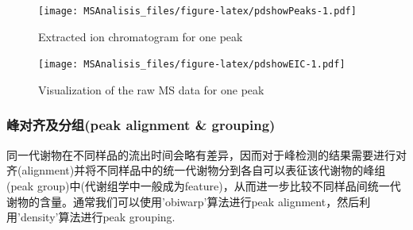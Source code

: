 \documentclass[]{ctexbook}
\newenvironment{Shaded}{\begin{snugshade}}{\end{snugshade}}
\newcommand{\CommentTok}[1]{\textcolor[rgb]{0.56,0.35,0.01}{\textit{#1}}}
\newcommand{\DataTypeTok}[1]{\textcolor[rgb]{0.13,0.29,0.53}{#1}}
\newcommand{\KeywordTok}[1]{\textcolor[rgb]{0.13,0.29,0.53}{\textbf{#1}}}
\newcommand{\NormalTok}[1]{#1}
\newcommand{\OperatorTok}[1]{\textcolor[rgb]{0.81,0.36,0.00}{\textbf{#1}}}
\newcommand{\StringTok}[1]{\textcolor[rgb]{0.31,0.60,0.02}{#1}}
\begin{document}
\begin{figure}
\centering
\texttt{[image: MSAnalisis\_files/figure-latex/pdshowPeaks-1.pdf]}
\caption{\label{fig:pdshowPeaks}Extracted ion chromatogram for one peak}
\end{figure}

\begin{Shaded}
\end{Shaded}

\begin{figure}
\centering
\texttt{[image: MSAnalisis\_files/figure-latex/pdshowEIC-1.pdf]}
\caption{\label{fig:pdshowEIC}Visualization of the raw MS data for one peak}
\end{figure}

\hypertarget{peak-alignment-grouping}{%
\subsubsection{峰对齐及分组(peak alignment \& grouping)}\label{peak-alignment-grouping}}

同一代谢物在不同样品的流出时间会略有差异，因而对于峰检测的结果需要进行对齐(alignment)并将不同样品中的统一代谢物分到各自可以表征该代谢物的峰组(peak group)中(代谢组学中一般成为feature)，从而进一步比较不同样品间统一代谢物的含量。通常我们可以使用'obiwarp'算法进行peak alignment，然后利用'density'算法进行peak grouping.
\end{document}
